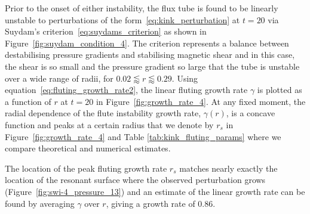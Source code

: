 \documentclass[fleqn,usenatbib]{mnras}
\newcommand{\rev}[1]{{\color{red} {#1}}}
\begin{document}

Prior to the onset of either instability, the flux tube is found to be linearly
unstable to perturbations of the form~\eqref{eq:kink_perturbation} at $t=20$
via Suydam's criterion~\eqref{eq:suydams_criterion} as shown in
Figure~\ref{fig:suydam_condition_4}. The criterion represents a
balance between destabilising pressure gradients and stabilising
magnetic shear and in this case, the shear is so small and the
pressure gradient so large that the tube is unstable over a wide range
of radii, for $ 0.02 \lessapprox r \lessapprox 0.29$.
\rev{Using equation~\eqref{eq:fluting_growth_rate2}, the} linear
fluting  growth rate $\gamma$ is plotted as a function of $r$ at
$t=20$ in Figure~\ref{fig:growth_rate_4}. \rev{At any fixed moment,
the radial dependence of the flute instability growth rate, $\gamma(r)$, is a concave
function and peaks at a certain radius that we denote by $r_s$ in
Figure~\ref{fig:growth_rate_4} and Table \ref{tab:kink_fluting_params}
where we compare theoretical and numerical estimates.}

The location of the peak \rev{fluting growth rate $r_s$} matches
nearly exactly the location of the resonant surface where the observed perturbation grows
(Figure~\ref{fig:swi-4_pressure_13}) and an estimate of the linear growth rate
can be found by averaging $\gamma$ over $r$, giving a growth rate of $0.86$.
\end{document}
